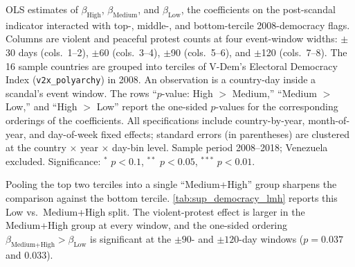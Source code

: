 \documentclass[11pt]{article}
\let\mathbetasym\beta
\renewcommand{\beta}{\ensuremath{\mathbetasym}}
\begin{document}
\begin{table}[htb!]
    \caption{Effect by 2008 level of democracy, tercile split.}
    \label{tab:sup_democracy_terciles}
    \begin{center}
        \scriptsize{}
    \end{center}
    \footnotesize{OLS estimates of $\beta_{\text{High}}$, $\beta_{\text{Medium}}$, and $\beta_{\text{Low}}$, the coefficients on the post-scandal indicator interacted with top-, middle-, and bottom-tercile 2008-democracy flags. Columns are violent and peaceful protest counts at four event-window widths: $\pm$30 days (cols.\ 1--2), $\pm$60 (cols.\ 3--4), $\pm$90 (cols.\ 5--6), and $\pm$120 (cols.\ 7--8). The 16 sample countries are grouped into terciles of V-Dem's Electoral Democracy Index (\texttt{v2x\_polyarchy}) in 2008. An observation is a country-day inside a scandal's event window. The rows ``$p$-value: High $>$ Medium,'' ``Medium $>$ Low,'' and ``High $>$ Low'' report the one-sided $p$-values for the corresponding orderings of the coefficients. All specifications include country-by-year, month-of-year, and day-of-week fixed effects; standard errors (in parentheses) are clustered at the country $\times$ year $\times$ day-bin level. Sample period 2008--2018; Venezuela excluded. Significance: $^{*}$ $p<0.1$, $^{**}$ $p<0.05$, $^{***}$ $p<0.01$.}
\end{table}

Pooling the top two terciles into a single ``Medium+High'' group sharpens the comparison against the bottom tercile. \autoref{tab:sup_democracy_lmh} reports this Low vs.\ Medium+High split. The violent-protest effect is larger in the Medium+High group at every window, and the one-sided ordering $\beta_{\text{Medium+High}}>\beta_{\text{Low}}$ is significant at the $\pm 90$- and $\pm 120$-day windows ($p=0.037$ and $0.033$).
\end{document}
